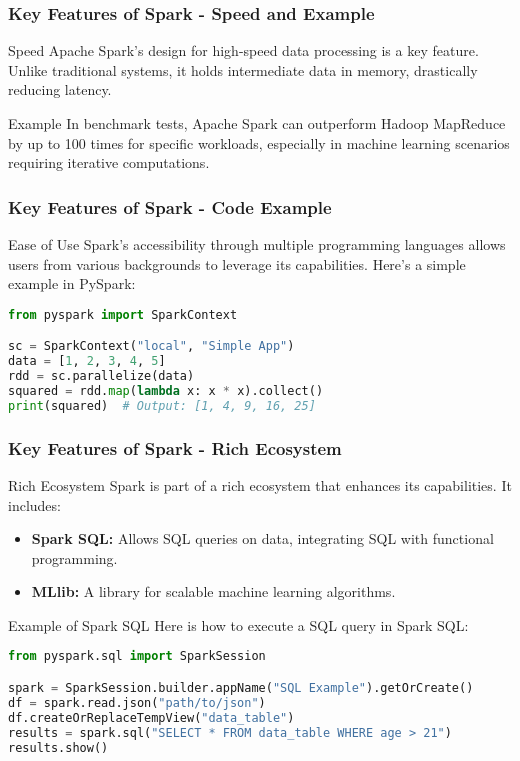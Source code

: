 \documentclass[aspectratio=169]{beamer}
\begin{document}
\begin{frame}[fragile]
    \frametitle{Key Features of Spark - Speed and Example}
    \begin{block}{Speed}
        Apache Spark's design for high-speed data processing is a key feature. Unlike traditional systems, it holds intermediate data in memory, drastically reducing latency.
    \end{block}
    \begin{block}{Example}
        In benchmark tests, Apache Spark can outperform Hadoop MapReduce by up to 100 times for specific workloads, especially in machine learning scenarios requiring iterative computations.
    \end{block}
\end{frame}

\begin{frame}[fragile]
    \frametitle{Key Features of Spark - Code Example}
    \begin{block}{Ease of Use}
        Spark’s accessibility through multiple programming languages allows users from various backgrounds to leverage its capabilities. Here’s a simple example in PySpark:
    \end{block}
    \begin{lstlisting}[language=Python]
from pyspark import SparkContext

sc = SparkContext("local", "Simple App")
data = [1, 2, 3, 4, 5]
rdd = sc.parallelize(data)
squared = rdd.map(lambda x: x * x).collect()
print(squared)  # Output: [1, 4, 9, 16, 25]
    \end{lstlisting}
\end{frame}

\begin{frame}[fragile]
    \frametitle{Key Features of Spark - Rich Ecosystem}
    \begin{block}{Rich Ecosystem}
        Spark is part of a rich ecosystem that enhances its capabilities. It includes:
        \begin{itemize}
            \item \textbf{Spark SQL:} Allows SQL queries on data, integrating SQL with functional programming.
            \item \textbf{MLlib:} A library for scalable machine learning algorithms.
        \end{itemize}
    \end{block}
    \begin{block}{Example of Spark SQL}
        Here is how to execute a SQL query in Spark SQL:
    \end{block}
    \begin{lstlisting}[language=Python]
from pyspark.sql import SparkSession

spark = SparkSession.builder.appName("SQL Example").getOrCreate()
df = spark.read.json("path/to/json")
df.createOrReplaceTempView("data_table")
results = spark.sql("SELECT * FROM data_table WHERE age > 21")
results.show()
    \end{lstlisting}
\end{frame}
\end{document}
